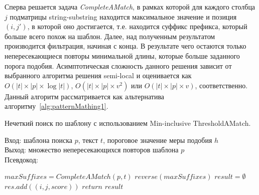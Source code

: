 Сперва решается задача \emph{CompleteAMatch}, в рамках которой для каждого столбца $j$ подматрицы string-substring находится максимальное значение и позиция $(i,j')$, в которой оно достигается, т.е. находится суффикс префикса, который больше всего похож на шаблон.
Далее, над полученным результатом производится фильтрация, начиная с конца.
В результате чего остаются только непересекающиеся повторы минимальной длины, которые больше заданного порога подобия.
Асимптотическая сложность данного решения зависит от выбранного алгоритма решения semi-local и оценивается как  $O(|t| \times |p| \times \log |t|)$, $O(|t| \times |p| \times v^2)$ или $O(|t| \times |p| \times v)$, 
соответственно.
Данный алгоритм рассматривается как альтернатива алгоритму~\ref{alg:patternMathing1}.

\begin{algorithm}[b!]
\caption{Нечеткий поиск по шаблону с использованием {Min-inclusive ThresholdAMatch}.}\label{alg:patternMathing2}
Вход: шаблона поиска $p$, текст $t$, пороговое значение меры подобия $h$\\
Выход: множество непересекающихся повторов шаблона $p$\\
Псевдокод:
\begin{algorithmic}[1]
\State $maxSuffixes= CompleteAMatch(p,t)$
\State $reverse(maxSuffixes)$
\State $result = \emptyset$
    \State $res.add((i,j,score))$ 
    \EndIf
\EndFor
\State $return$ $result$

\end{algorithmic}
\end{algorithm}



